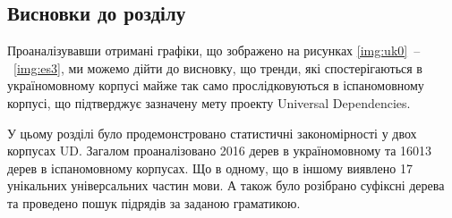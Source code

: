 \subsection*{Висновки до розділу }
Проаналізувавши отримані графіки, що зображено на рисунках
\ref{img:uk0}~\nobreakdash--~\ref{img:es3},
ми можемо дійти до висновку, що тренди, які
спостерігаються в україномовному корпусі майже так само прослідковуються в
іспаномовному корпусі, що підтверджує зазначену мету проекту Universal Dependencies.

У цьому розділі було продемонстровано статистичні закономірності у двох
корпусах UD. Загалом проаналізовано 2016 дерев в україномовному та 16013 дерев
в іспаномовному корпусах. Що в одному, що в іншому виявлено 17 унікальних
універсальних частин мови. А також було розібрано суфіксні дерева та проведено
пошук підрядів за заданою граматикою.
